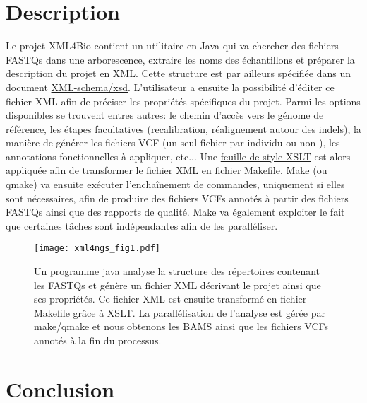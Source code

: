 \documentclass[long, final]{jobim2013}
\begin{document}
\section{Description}
Le projet XML4Bio contient un utilitaire en Java qui va chercher des fichiers FASTQs dans une arborescence, extraire les noms des échantillons et préparer la description du projet en XML. Cette structure est par ailleurs spécifiée dans un document \href{https://github.com/lindenb/xml4ngs/blob/master/src/main/resources/xsd/project.xsd}{XML-schema/xsd}. L'utilisateur a ensuite la possibilité d'éditer ce fichier XML afin de préciser les propriétés spécifiques du projet. Parmi les options disponibles se trouvent entres autres: le chemin d'accès vers le génome de référence, les étapes facultatives (recalibration, réalignement autour des indels), la manière de générer les fichiers VCF (un seul fichier par individu ou non ), les annotations fonctionnelles à appliquer, etc... Une \href{https://github.com/lindenb/xml4ngs/blob/master/stylesheets/project2make.xsl}{feuille de style XSLT} est alors appliquée afin de transformer le fichier XML en fichier Makefile. Make (ou qmake) va ensuite exécuter l'enchaînement de commandes, uniquement si elles sont nécessaires, afin de produire des fichiers VCFs annotés à partir des fichiers FASTQs ainsi que des rapports de qualité. Make va également exploiter le fait que certaines tâches sont indépendantes afin de les paralléliser.

 \begin{figure}
   \begin{center}
     \setlength{\unitlength}{5mm}
     \texttt{[image: xml4ngs\_fig1.pdf]}
   \end{center}
   \caption{Un programme java analyse la structure des répertoires contenant les FASTQs et génère un fichier XML décrivant le projet ainsi que ses propriétés. Ce fichier XML est ensuite transformé en fichier Makefile grâce à XSLT. La parallélisation de l'analyse est gérée par make/qmake et nous obtenons les BAMS ainsi que les fichiers VCFs annotés à la fin du processus.}
   \label{fig:puzzle}
 \end{figure}


\section{Conclusion}
\end{document}

